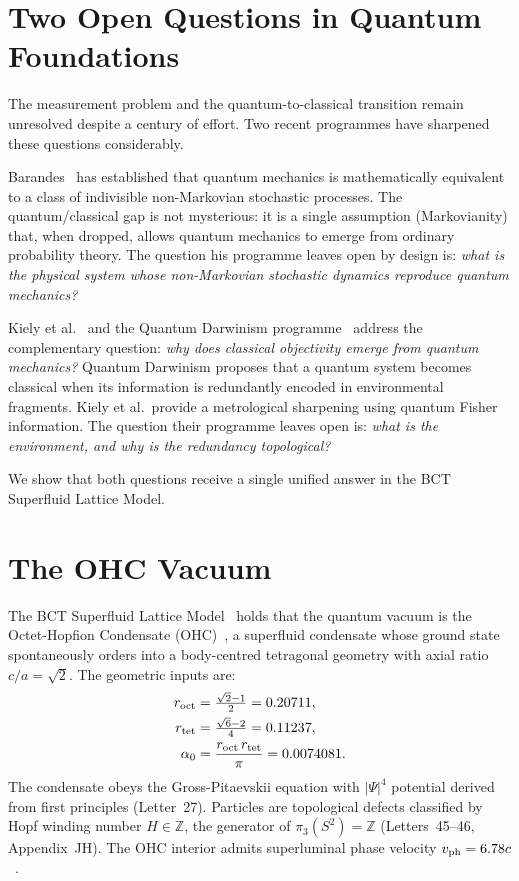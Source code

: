 \documentclass[aps,prl,preprint,superscriptaddress,floatfix]{revtex4-2}
\begin{document}
\section{Two Open Questions in Quantum Foundations}

The measurement problem and the quantum-to-classical transition remain
unresolved despite a century of effort. Two recent programmes have sharpened
these questions considerably.

Barandes~\cite{barandes2023,barandes2025,barandes2026} has established that
quantum mechanics is mathematically equivalent to a class of indivisible
non-Markovian stochastic processes. The quantum/classical gap is not mysterious:
it is a single assumption (Markovianity) that, when dropped, allows quantum
mechanics to emerge from ordinary probability theory. The question his programme
leaves open by design is: \textit{what is the physical system whose
non-Markovian stochastic dynamics reproduce quantum mechanics?}

Kiely et al.~\cite{kiely2026} and the Quantum Darwinism programme~\cite{zurek2003,zurek2009}
address the complementary question: \textit{why does classical objectivity
emerge from quantum mechanics?} Quantum Darwinism proposes that a quantum
system becomes classical when its information is redundantly encoded in
environmental fragments. Kiely et al.\ provide a metrological sharpening
using quantum Fisher information. The question their programme leaves open
is: \textit{what is the environment, and why is the redundancy topological?}

We show that both questions receive a single unified answer in the BCT
Superfluid Lattice Model.

\section{The OHC Vacuum}

The BCT Superfluid Lattice Model~\cite{prl,monograph} holds that the quantum
vacuum is the Octet-Hopfion Condensate (OHC)~\cite{bctjh,bct36}, a superfluid
condensate whose ground state spontaneously orders into a body-centred
tetragonal geometry with axial ratio $c/a=\sqrt{2}$. The geometric inputs are:
\begin{align}
r_{\rm oct} &= \tfrac{\sqrt{2}-1}{2} = 0.20711,\\
r_{\rm tet} &= \tfrac{\sqrt{6}-2}{4} = 0.11237,\\
\alpha_0 &= \frac{r_{\rm oct}\,r_{\rm tet}}{\pi} = 0.0074081.
\end{align}
The condensate obeys the Gross-Pitaevskii equation with $|\Psi|^4$ potential
derived from first principles (Letter~27). Particles are topological defects
classified by Hopf winding number $H\in\mathbb{Z}$, the generator of
$\pi_3(S^2)=\mathbb{Z}$ (Letters~45--46, Appendix~JH). The OHC interior
admits superluminal phase velocity $v_{\rm ph}=6.78c$~\cite{bctjh}.
\end{document}
